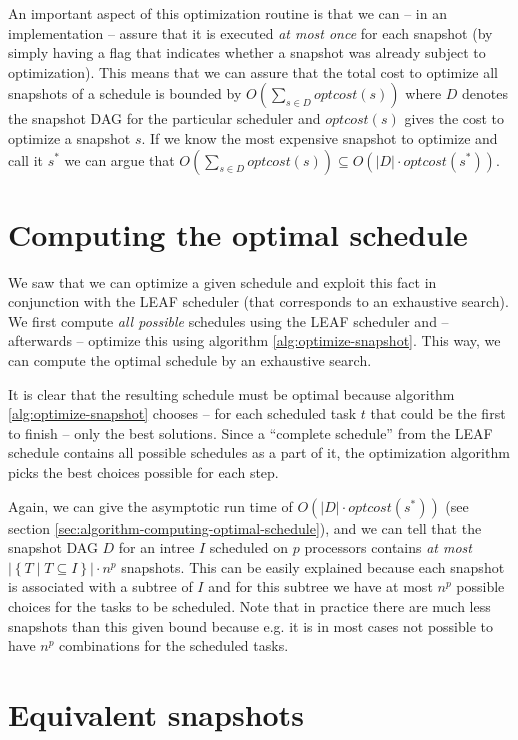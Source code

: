 An important aspect of this optimization routine is that we can -- in an implementation -- assure that it is executed \emph{at most once} for each snapshot (by simply having a flag that indicates whether a snapshot was already subject to optimization). This means that we can assure that the total cost to optimize all snapshots of a schedule is bounded by $O\left(\sum_{s\in D} optcost(s)\right)$ where $D$ denotes the snapshot DAG for the particular scheduler and $optcost(s)$ gives the cost to optimize a snapshot $s$. If we know the most expensive snapshot to optimize and call it $s^*$ we can argue that $O\left(\sum_{s\in D} optcost(s)\right) \subseteq O\left(|D|\cdot optcost(s^*)\right)$.

\section{Computing the optimal schedule}
\label{sec:intro-computing-optimal-schedule}

We saw that we can optimize a given schedule and exploit this fact in conjunction with the LEAF scheduler (that corresponds to an exhaustive search). We first compute \emph{all possible} schedules using the LEAF scheduler and -- afterwards -- optimize this using algorithm \ref{alg:optimize-snapshot}. This way, we can compute the optimal schedule by an exhaustive search.

It is clear that the resulting schedule must be optimal because algorithm \ref{alg:optimize-snapshot} chooses -- for each scheduled task $t$ that could be the first to finish -- only the best solutions. Since a ``complete schedule'' from the LEAF schedule contains all possible schedules as a part of it, the optimization algorithm picks the best choices possible for each step.

Again, we can give the asymptotic run time of $O\left(|D| \cdot optcost(s^*)\right)$ (see section \ref{sec:algorithm-computing-optimal-schedule}), and we can tell that the snapshot DAG $D$ for an intree $I$ scheduled on $p$ processors contains \emph{at most} $| \left\{ T \mid T\subseteq I \right\} | \cdot n^p$ snapshots. This can be easily explained because each snapshot is associated with a subtree of $I$ and for this subtree we have at most $n^p$ possible choices for the tasks to be scheduled. Note that in practice there are much less snapshots than this given bound because e.g. it is in most cases not possible to have $n^p$ combinations for the scheduled tasks.

\section{Equivalent snapshots}
\label{sec:intro-first-glance-schedules}

